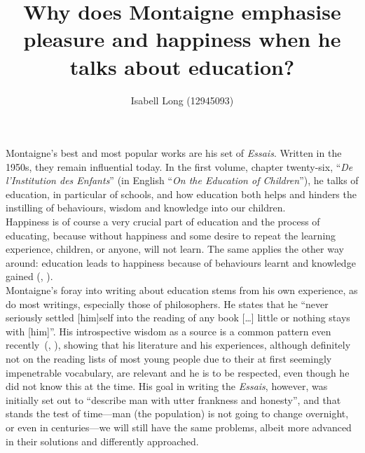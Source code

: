 \documentclass[12pt,a4paper]{article}
\begin{document}
\title{Why does Montaigne emphasise pleasure and happiness when he
talks about education?}
\author{Isabell Long (12945093)}
\maketitle

Montaigne's best and most popular works are his set of
\textit{Essais}. Written in the 1950s, they remain influential today.
In the first volume, chapter twenty-six, ``\textit{De l'Institution
des Enfants}'' (in English ``\textit{On the Education of Children}''),
he talks of education, in particular of schools, and how education
both helps and hinders the instilling of behaviours, wisdom and
knowledge into our children.\\

Happiness is of course a very crucial part of education and the
process of educating, because without happiness and some desire to
repeat the learning experience, children, or anyone, will not learn.
The same applies the other way around: education leads to happiness
because of behaviours learnt and knowledge gained
(\citeauthor{happiness-education}, \citeyear{happiness-education}).\\

Montaigne's foray into writing about education stems from his own
experience, as do most writings, especially those of philosophers. He
states that he ``never seriously settled [him]self into the reading of
any book [\ldots] little or nothing stays with [him]''. His
introspective wisdom as a source is a common pattern even
recently~(\citeauthor{recent-relevance}, \citeyear{recent-relevance}),
showing that his literature and his experiences, although definitely
not on the reading lists of most young people due to their at first
seemingly impenetrable vocabulary, are relevant and he is to be
respected, even though he did not know this at the time. His goal in
writing the \textit{Essais}, however, was initially set out to
``describe man with utter frankness and honesty'', and that stands the
test of time---man (the population) is not going to change overnight,
or even in centuries---we will still have the same problems, albeit
more advanced in their solutions and differently approached.\\
\end{document}
